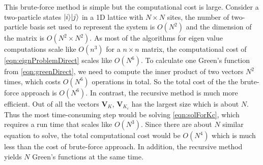 This brute-force method is simple but the computational cost is large. Consider a 
two-particle states $| i \rangle| j \rangle$ in a 1D lattice with $N \times N$ sites, the number of two-particle basis set used
to represent the system is $O(N^2)$ and the dimension of the matrix is $O(N^2 \times N^2)$. As most of the 
algorithms for eigen value computations scale like $O(n^3)$ for a $n\times n$ matrix, the computational cost of
\autoref{eqn:eignProblemDirect} scales like $O(N^6)$. To calculate one Green's function from 
\autoref{eqn:greenDirect}, we need to compute the inner product of  two vectors $N^2$ times, which 
costs $O(N^6)$ operations in total. So the total cost of the the brute-force approach is $O(N^6)$. 
In contrast, the recursive method is much more efficient. Out of all the vectors $\mathbf{V}_{K}$,  $\mathbf{V}_{K_c}$
has the largest size which is about $N$. Thus the most time-consuming step would be solving \autoref{eqn:solForKc},
which requires a run time that scales like $O(N^3)$. Since there are about $N$ similar equation to solve, the total
computational cost would be $O(N^4)$ which is much less than the cost of brute-force approach. In addition, the
recursive method yields $N$ Green's functions at the same time.

